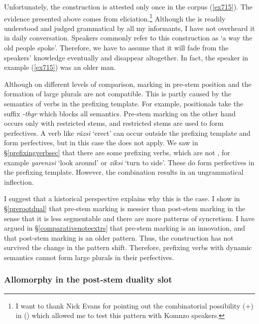 Unfortunately, the  construction is attested only once in the corpus (\ref{ex715}). The evidence presented above comes from eliciation.\footnote{I want to thank Nick Evans for pointing out the combinatorial possibility (\Sg+\Du) in  (\citealt{Evans:2014bz}) which allowed me to test this pattern with Komnzo speakers.} Although the  is readily understood and judged grammatical by all my informants, I have not overheard it in daily conversation. Speakers commonly refer to this construction as `a way the old people spoke'. Therefore, we have to assume that it will fade from the speakers'  knowledge eventually and disappear altogether. In fact, the speaker in example (\ref{ex715}) was an older man.

Although on different levels of comparison,  marking in pre-stem position and the formation of large plurals are not compatible. This is partly caused by the  semantics of verbs in the prefixing template. For example, positionals take the  suffix \emph{-thgr} which blocks all  semantics. Pre-stem  marking on the other hand occurs only with restricted stems, and restricted stems are used to form perfectives. A  verb like \emph{räzsi} `erect' can occur outside the prefixing template and form perfectives, but in this case the  does not apply. We saw in {\S}\ref{prefixingverbsec} that there are some prefixing verbs, which are not , for example \emph{yarenzsi} `look around' or \emph{ziksi} `turn to side'. These do form perfectives in the prefixing template. However, the  combination results in an ungrammatical inflection.

I suggest that a historical perspective explains why this is the case. I show in {\S}\ref{prerootdual} that pre-stem  marking is messier than post-stem  marking in the sense that it is less segmentable and there are more patterns of syncretism. I have argued in {\S}\ref{comparativenoteextrs} that pre-stem  marking is an innovation, and that post-stem  marking is an older pattern. Thus, the  construction has not survived the change in the pattern shift. Therefore, prefixing verbs with dynamic semantics cannot form large plurals in their perfectives.

\subsubsection{Allomorphy in the post-stem duality slot} \label{allomorphdualsuffix}

